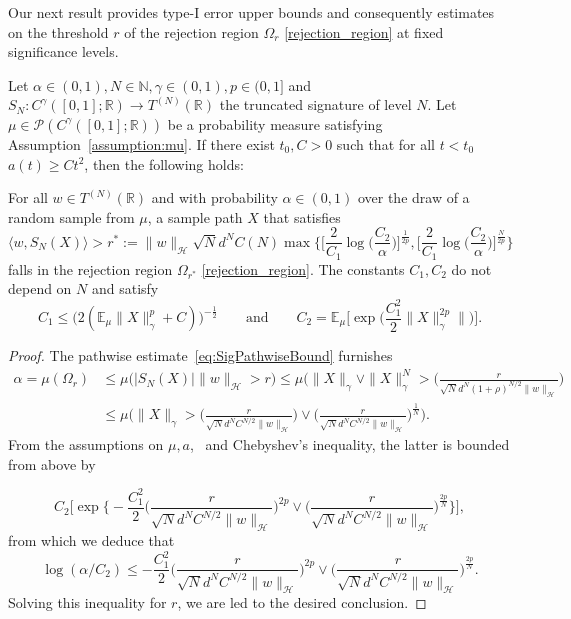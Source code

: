 \documentclass[twoside,11pt]{article}
\numberwithin{equation}{section}
\numberwithin{theorem}{section}
\newcommand{\R}{\mathbb{R}}
\newcommand{\N}{\mathbb{N}}
\newcommand{\ex}{\mathbb{E}}
\newcommand{\h}{\mathcal{H}}
\begin{document}
Our next result provides type-$\mathrm{I}$ error upper bounds and consequently estimates on the threshold $r$ of the rejection region $\Omega_r$ \eqref{rejection_region} at fixed significance levels.

\begin{theorem}\label{thm:TypeIerror} Let $\alpha\in(0,1), N\in\N,\gamma\in(0,1), p\in(0,1]$ and $S_N: C^\gamma([0,1];\R)\rightarrow T^{(N)}(\R)$ the truncated signature of level $N$. Let $\mu\in\mathscr{P}(C^\gamma([0,1];\R))$ be a probability measure satisfying Assumption~\ref{assumption:mu}. 
If there exist $t_0, C>0$ such that for all $t<t_0$  $a(t)\geq C t^2$,
then the following holds:

For all $w\in T^{(N)}(\R)$ and with probability $\alpha \in (0,1)$ over the draw of a random sample from $\mu$, a sample path $X$ that satisfies 
\begin{equation}\label{eq:rstarddim}
\langle w, S_N(X)\rangle> r^*:=\|w\|_{\h}\sqrt{N}d^{N}C(N)\max\bigg\{ \bigg[\frac{2}{C_1}\log\bigg(\frac{C_2}{\alpha}   \bigg)\bigg]^{\frac{1}{2p}},  \bigg[\frac{2}{C_1}\log\bigg(\frac{C_2}{\alpha}   \bigg)\bigg]^{\frac{N}{2p}} \bigg\}
\end{equation}
falls in the rejection region $\Omega_{r^*}$ \eqref{rejection_region}. The constants $C_1, C_2$ do not depend on  $N$ and satisfy
$$
C_1\leq \bigg( 2(\ex_\mu\|X\|^p_{\gamma}+C)\bigg)^{-\frac{1}{2}}
\qquad\text{and}\qquad
C_2=\ex_\mu\bigg[\exp\bigg(\frac{C_1^2}{2}\|X\|^{2p}_{\gamma}\|\bigg)\bigg].
$$
\end{theorem}


\begin{proof} 
The pathwise estimate~\eqref{eq:SigPathwiseBound} furnishes
 \begin{align*}
\alpha = \mu(\Omega_r)
&\leq\mu\bigg( |S_N(X)|\|w\|_{\h}> r   \bigg)
  \leq \mu\bigg( \|X\|_\gamma \vee\|X\|^{N}_\gamma >\bigg(\frac{r}{\sqrt{N}d^{N}(1+\rho)^{N/2}\|w\|_{\h}}\bigg)\\
 & \leq \mu\bigg( \|X\|_\gamma>\bigg(\frac{r}{\sqrt{N}d^{N}C^{N/2}\|w\|_{\h}}\bigg)\vee \bigg(\frac{r}{\sqrt{N}d^{N}C^{N/2}\|w\|_{\h}}\bigg)^{\frac{1}{N}}      \bigg).
\end{align*}
From the assumptions on $\mu,a$,~\cite[Corollary 2.6(ii)]{gasteratos2023transportation} and Chebyshev's inequality, the latter is bounded from above by

$$ C_2
\bigg[\exp\bigg\{-\frac{C^2_1}{2}\bigg(\frac{r}{\sqrt{N}d^{N}C^{N/2}\|w\|_{\h}}\bigg)^{2p}\vee \bigg(\frac{r}{\sqrt{N}d^{N}C^{N/2}\|w\|_{\h}}\bigg)^{\frac{2p}{N}}      \bigg\}\bigg], 
$$
from which we deduce that 
$$
\log(\alpha/C_2)\leq-\frac{C^2_1}{2}\bigg(\frac{r}{\sqrt{N}d^{N}C^{N/2}\|w\|_{\h}}\bigg)^{2p}\vee \bigg(\frac{r}{\sqrt{N}d^{N}C^{N/2}\|w\|_{\h}}\bigg)^{\frac{2p}{N}} .  $$
Solving this inequality for $r$, we are led to the desired conclusion.
\end{proof}
\end{document}
